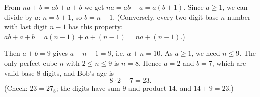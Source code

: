 From $na+b=ab+a+b$ we get $na=ab+a=a(b+1)$. Since $a\ge1$, we can divide by $a$: $n=b+1$, so $b=n-1$. (Conversely, every two-digit base-$n$ number with last digit $n-1$ has this property: $ab+a+b=a(n-1)+a+(n-1)=na+(n-1)$.)

Then $a+b=9$ gives $a+n-1=9$, i.e. $a+n=10$. As $a\ge1$, we need $n\le9$. The only perfect cube $n$ with $2\le n\le9$ is $n=8$. Hence $a=2$ and $b=7$, which are valid base-$8$ digits, and Bob's age is
\[8\cdot2+7=\boxed{23}.\]
(Check: $23=27_8$; the digits have sum $9$ and product $14$, and $14+9=23$.)
